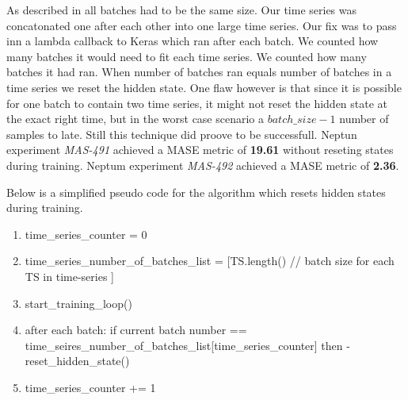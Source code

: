 As described in  all
batches had to be the same size. Our time series was concatonated one after
each other into one large time series.
Our fix was to pass inn a lambda callback to Keras which ran after each batch.
We counted how many batches it would need to fit each time series.
We counted how many batches it had ran. When number of batches ran equals
number of batches in a time series we reset the hidden state.
One flaw however is that since it is possible for one batch to
contain two time series, it might not reset the hidden state at the exact
right time, but in the worst case scenario a $batch\_size - 1$ number of
samples to late. Still this technique did proove to be successfull.
Neptun experiment \textit{MAS-491} achieved a MASE metric of \textbf{19.61}
without reseting states during training.
Neptum experiment \textit{MAS-492} achieved a MASE metric of \textbf{2.36}.

Below is a simplified pseudo code for the algorithm which resets hidden states
during training.
\begin{enumerate}
  \item time\_series\_counter = 0
  \item time\_series\_number\_of\_batches\_list = [TS.length() // batch size for each TS in time-series ]
  \item start\_training\_loop()
  \item after each batch: if current batch number == time\_seires\_number\_of\_batches\_list[time\_series\_counter]
        then -\> reset\_hidden\_state()
  \item time\_series\_counter += 1
\end{enumerate}
